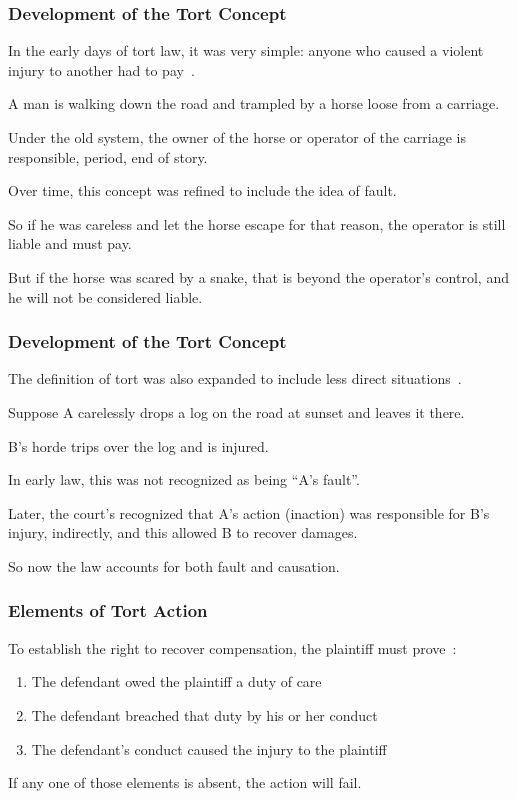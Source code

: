 \begin{frame}
\frametitle{Development of the Tort Concept}

In the early days of tort law, it was very simple: anyone who caused a violent injury to another had to pay~\cite{lba}.

A man is walking down the road and trampled by a horse loose from a carriage.

Under the old system, the owner of the horse or operator of the carriage is responsible, period, end of story.

Over time, this concept was refined to include the idea of \alert{fault}. 

So if he was careless and let the horse escape for that reason, the operator is still liable and must pay.

But if the horse was scared by a snake, that is beyond the operator's control, and he will not be considered liable.

\end{frame}



\begin{frame}
\frametitle{Development of the Tort Concept}

The definition of tort was also expanded to include less direct situations~\cite{lba}.


Suppose A carelessly drops a log on the road at sunset and leaves it there.

B's horde trips over the log and is injured.

In early law, this was not recognized as being ``A's fault''.

Later, the court's recognized that A's action (inaction) was responsible for B's injury, indirectly, and this allowed B to recover damages.

So now the law accounts for both fault and \alert{causation}.

\end{frame}


\begin{frame}
\frametitle{Elements of Tort Action}

To establish the right to recover compensation, the plaintiff must prove~\cite{lpe}:

\begin{enumerate}
	\item The defendant owed the plaintiff a duty of care
	\item The defendant breached that duty by his or her conduct
	\item The defendant's conduct caused the injury to the plaintiff
\end{enumerate}

If any one of those elements is absent, the action will fail.

\end{frame}



